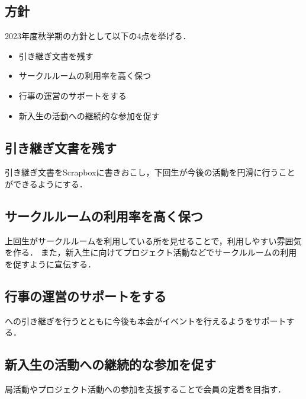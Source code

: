 \subsection*{\newGradeIfKouki{}\thirdGrade{}方針}


2023年度秋学期の\thirdGrade{}方針として以下の4点を挙げる．

\begin{itemize}
    \item 引き継ぎ文書を残す
    \item サークルルームの利用率を高く保つ
    \item 行事の運営のサポートをする
    \item 新入生の活動への継続的な参加を促す
\end{itemize}

\subsection*{引き継ぎ文書を残す}
引き継ぎ文書をScrapboxに書きおこし，下回生が今後の活動を円滑に行うことができるようにする．

\subsection*{サークルルームの利用率を高く保つ}
上回生がサークルルームを利用している所を見せることで，利用しやすい雰囲気を作る．
また，新入生に向けてプロジェクト活動などでサークルルームの利用を促すように宣伝する．

\subsection*{行事の運営のサポートをする}
\secondGrade{}への引き継ぎを行うとともに今後も本会がイベントを行えるよう\secondGrade{}をサポートする．

\subsection*{新入生の活動への継続的な参加を促す}
局活動やプロジェクト活動への参加を支援することで会員の定着を目指す．
